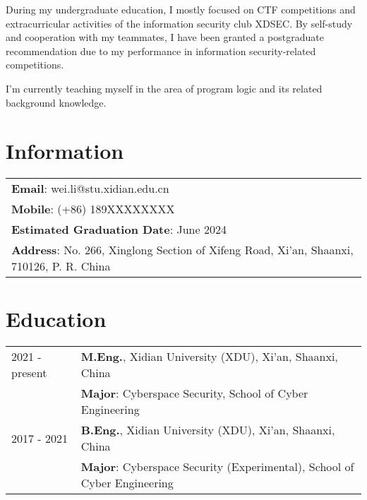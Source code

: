 \documentclass[a4paper,12pt]{article}
\begin{document}
During my undergraduate education, I mostly focused on CTF competitions and extracurricular activities of the information security club XDSEC. By self-study and cooperation with my teammates, I have been granted a postgraduate recommendation due to my performance in information security-related competitions.

I’m currently teaching myself in the area of program logic and its related background knowledge.


\section{Information}

\begin{tabularx}{\linewidth}{ @{}l }
\textbf{Email}: {wei.li@stu.xidian.edu.cn}\\
\textbf{Mobile}: {(+86) 189XXXXXXXX}\\
\textbf{Estimated Graduation Date}: {June 2024}\\
\textbf{Address}: {No. 266, Xinglong Section of Xifeng Road, Xi’an, Shaanxi, 710126, P. R. China}\\

\end{tabularx}

\section{Education}
\begin{tabularx}{\linewidth}{@{}l X@{}}	

2021 - present & \textbf{M.Eng.}, Xidian University (XDU),  Xi’an, Shaanxi, China \\ 
    & \textbf{Major}: Cyberspace Security, School of Cyber Engineering \\
2017 - 2021 & \textbf{B.Eng.}, Xidian University (XDU),  Xi’an, Shaanxi, China \\ 
    & \textbf{Major}: Cyberspace Security (Experimental), School of Cyber Engineering \\


\end{tabularx}
\end{document}
